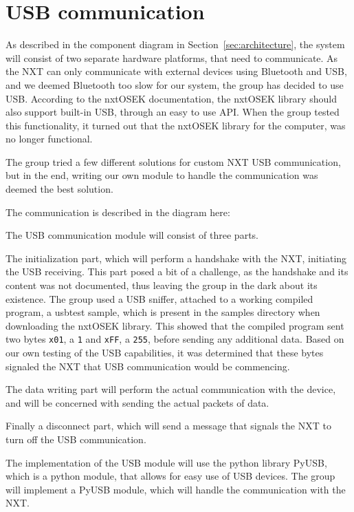 \section{USB communication}
\label{sec:usb}
As described in the component diagram in Section~\ref{sec:architecture}, the system will consist of two separate hardware platforms, that need to communicate.
As the NXT can only communicate with external devices using Bluetooth and USB, and we deemed Bluetooth too slow for our system, the group has decided to use USB.
According to the nxtOSEK documentation, the nxtOSEK library should also support built-in USB, through an easy to use API\cite{ecrobotUSB}.
When the group tested this functionality, it turned out that the nxtOSEK library for the computer, was no longer functional.

The group tried a few different solutions for custom NXT USB communication, but in the end, writing our own module to handle the communication was deemed the best solution.

The communication is described in the diagram here:


The USB communication module will consist of three parts.

The initialization part, which will perform a handshake with the NXT, initiating the USB receiving.
This part posed a bit of a challenge, as the handshake and its content was not documented, thus leaving the group in the dark about its existence.
The group used a USB sniffer, attached to a working compiled program, a usbtest sample, which is present in the samples directory when downloading the nxtOSEK library\cite{ecrobotUSB}.
This showed that the compiled program sent two bytes \texttt{x01}, a \texttt{1} and \texttt{xFF}, a \texttt{255}, before sending any additional data.
Based on our own testing of the USB capabilities, it was determined that these bytes signaled the NXT that USB communication would be commencing.

The data writing part will perform the actual communication with the device, and will be concerned with sending the actual packets of data.

Finally a disconnect part, which will send a message that signals the NXT to turn off the USB communication.



The implementation of the USB module will use the python library PyUSB, which is a python module, that allows for easy use of USB devices\cite{PyUSB}.
The group will implement a PyUSB module, which will handle the communication with the NXT.



